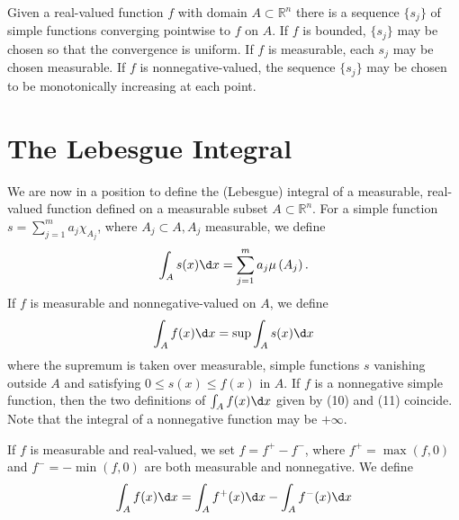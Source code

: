 \begin{theorem}
  Given a real-valued function $f$ with domain $A \subset \mathbb{R}^n$ there is a sequence $\{s_j\}$ of simple functions converging pointwise to $f$ on $A$. If $f$ is bounded, $\{s_j\}$ may be chosen so that the convergence is uniform. If $f$ is measurable, each $s_j$ may be chosen measurable. If $f$ is nonnegative-valued, the sequence $\{s_j\}$ may be chosen to be monotonically increasing at each point.
\end{theorem}


\section{The Lebesgue Integral}

\begin{para}
  We are now in a position to define the (Lebesgue) integral of a measurable, real-valued function defined on a measurable subset $A \subset \mathbb{R}^n$. For a simple function $s=\sum_{j=1}^m a_j \chi_{A_j}$, where $A_j \subset A, A_j$ measurable, we define
  \[
  \int_A s(x) \d x=\sum_{j=1}^m a_j \mu\left(A_j\right) .
  \]
  If $f$ is measurable and nonnegative-valued on $A$, we define
  \[
  \int_A f(x) \d x=\sup \int_A s(x) \d x
  \]
  where the supremum is taken over measurable, simple functions $s$ vanishing outside $A$ and satisfying $0 \leq s(x) \leq f(x)$ in $A$. If $f$ is a nonnegative simple function, then the two definitions of $\int_A f(x) \d x$ given by (10) and (11) coincide. Note that the integral of a nonnegative function may be $+\infty$.
  
  If $f$ is measurable and real-valued, we set $f=f^{+}-f^{-}$, where $f^{+}=\max (f, 0)$ and $f^{-}=-\min (f, 0)$ are both measurable and nonnegative. We define
  \[
  \int_A f(x) \d x=\int_A f^{+}(x) \d x-\int_A f^{-}(x) \d x
  \]
\end{para}


